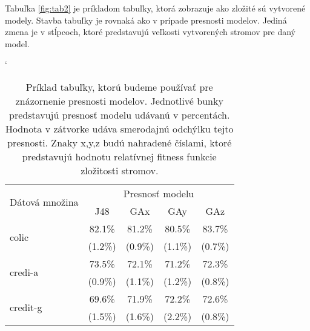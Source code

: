 Tabuľka \ref{fig:tab2} je príkladom tabuľky, ktorá zobrazuje ako zložité sú vytvorené modely. Stavba tabuľky je rovnaká ako v prípade presnosti modelov. Jediná zmena je v stĺpcoch, ktoré predstavujú veľkosti vytvorených stromov pre daný model.

\renewcommand{\figurename}{Tabuľka}
\begin{table}[t]
\catcode`
\centering 
\newcommand\T{\rule{0pt}{2.6ex}}       %
\newcommand\B{\rule[-1.2ex]{0pt}{0pt}} %
\begin{tabular}{|l||c|c|c|c||}
\hline \multirow{2}{*}{Dátová množina} & \multicolumn{4}{|c||}{Presnosť modelu} \\ 
\cline{2-5} & J48 & GAx & GAy & GAz \\
\hline
\hline \multirow{2}{*}{colic} & 82.1\% & 81.2\% & 80.5\% & 83.7\% \T\\[-1.5ex]
& \tiny (1.2\%) & \tiny (0.9\%) & \tiny (1.1\%) & \tiny (0.7\%)\B\\
\hline \multirow{2}{*}{credi-a} & 73.5\% & 72.1\% & 71.2\% & 72.3\% \T\\[-1.5ex]
& \tiny (0.9\%) & \tiny (1.1\%) & \tiny (1.2\%) & \tiny (0.8\%)\B\\
\hline \multirow{2}{*}{credit-g} & 69.6\% & 71.9\% & 72.2\% & 72.6\% \T\\[-1.5ex]
& \tiny (1.5\%) & \tiny (1.6\%) & \tiny (2.2\%) & \tiny (0.8\%)\B\\
\hline
\end{tabular}
\caption{Príklad tabuľky, ktorú budeme používať pre znázornenie presnosti modelov. Jednotlivé bunky predstavujú presnosť modelu udávanú v percentách. Hodnota v zátvorke udáva smerodajnú odchýlku tejto presnosti. Znaky x,y,z budú nahradené číslami, ktoré predstavujú hodnotu relatívnej fitness funkcie zložitosti stromov.}\label{fig:tab1}
\end{table}


